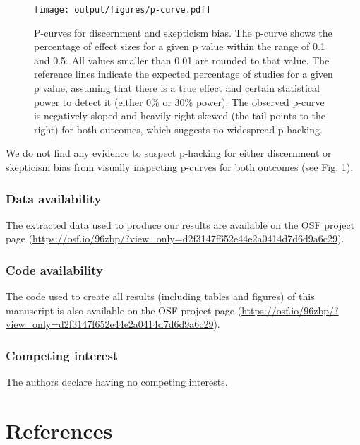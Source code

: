 \documentclass[
  doc,floatsintext]{apa6}
\begin{document}
\begin{figure}
\centering
\texttt{[image: output/figures/p-curve.pdf]}
\caption{\label{fig:p-curve}P-curves for discernment and skepticism bias. The p-curve shows the percentage of effect sizes for a given p value within the range of 0.1 and 0.5. All values smaller than 0.01 are rounded to that value. The reference lines indicate the expected percentage of studies for a given p value, assuming that there is a true effect and certain statistical power to detect it (either 0\% or 30\% power). The observed p-curve is negatively sloped and heavily right skewed (the tail points to the right) for both outcomes, which suggests no widespread p-hacking.}
\end{figure}

We do not find any evidence to suspect p-hacking for either discernment or skepticism bias from visually inspecting p-curves for both outcomes (see Fig. \ref{fig:p-curve}).

\subsubsection{Data availability}\label{data-availability}

The extracted data used to produce our results are available on the OSF project page (\url{https://osf.io/96zbp/?view_only=d2f3147f652e44e2a0414d7d6d9a6c29}).

\subsubsection{Code availability}\label{code-availability}

The code used to create all results (including tables and figures) of this manuscript is also available on the OSF project page (\url{https://osf.io/96zbp/?view_only=d2f3147f652e44e2a0414d7d6d9a6c29}).

\subsubsection{Competing interest}\label{competing-interest}

The authors declare having no competing interests.

\FloatBarrier

\section{References}\label{references}
\end{document}
